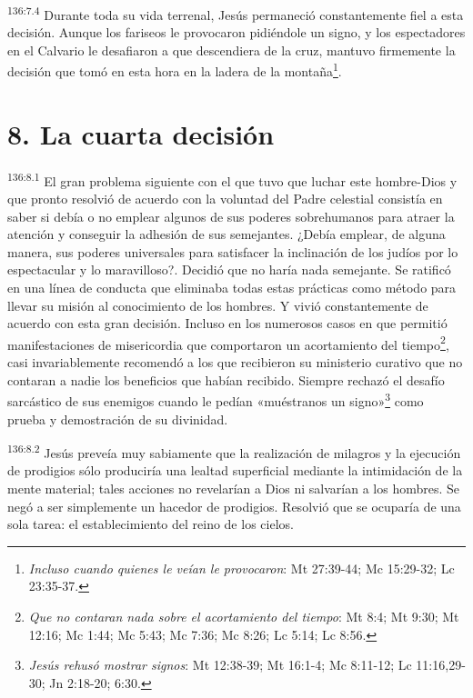 \par
\textsuperscript{136:7.4} Durante toda su vida terrenal, Jesús permaneció constantemente fiel a esta decisión. Aunque los fariseos le provocaron pidiéndole un signo, y los espectadores en el Calvario le desafiaron a que descendiera de la cruz, mantuvo firmemente la decisión que tomó en esta hora en la ladera de la montaña\footnote{\textit{Incluso cuando quienes le veían le provocaron}: Mt 27:39-44; Mc 15:29-32; Lc 23:35-37.}.

\section*{8. La cuarta decisión}
\par
\textsuperscript{136:8.1} El gran problema siguiente con el que tuvo que luchar este hombre-Dios y que pronto resolvió de acuerdo con la voluntad del Padre celestial consistía en saber si debía o no emplear algunos de sus poderes sobrehumanos para atraer la atención y conseguir la adhesión de sus semejantes. ¿Debía emplear, de alguna manera, sus poderes universales para satisfacer la inclinación de los judíos por lo espectacular y lo maravilloso?. Decidió que no haría nada semejante. Se ratificó en una línea de conducta que eliminaba todas estas prácticas como método para llevar su misión al conocimiento de los hombres. Y vivió constantemente de acuerdo con esta gran decisión. Incluso en los numerosos casos en que permitió manifestaciones de misericordia que comportaron un acortamiento del tiempo\footnote{\textit{Que no contaran nada sobre el acortamiento del tiempo}: Mt 8:4; Mt 9:30; Mt 12:16; Mc 1:44; Mc 5:43; Mc 7:36; Mc 8:26; Lc 5:14; Lc 8:56.}, casi invariablemente recomendó a los que recibieron su ministerio curativo que no contaran a nadie los beneficios que habían recibido. Siempre rechazó el desafío sarcástico de sus enemigos cuando le pedían «muéstranos un signo»\footnote{\textit{Jesús rehusó mostrar signos}: Mt 12:38-39; Mt 16:1-4; Mc 8:11-12; Lc 11:16,29-30; Jn 2:18-20; 6:30.} como prueba y demostración de su divinidad.

\par
\textsuperscript{136:8.2} Jesús preveía muy sabiamente que la realización de milagros y la ejecución de prodigios sólo produciría una lealtad superficial mediante la intimidación de la mente material; tales acciones no revelarían a Dios ni salvarían a los hombres. Se negó a ser simplemente un hacedor de prodigios. Resolvió que se ocuparía de una sola tarea: el establecimiento del reino de los cielos.

